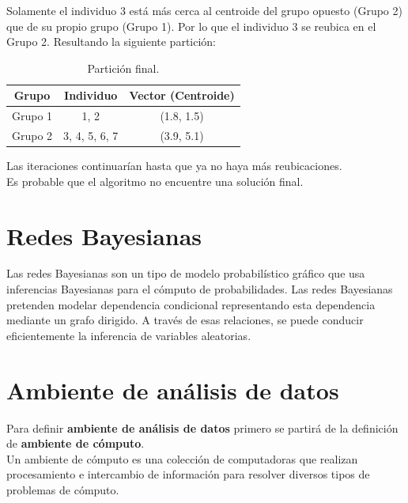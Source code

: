 \begin{UClist}
	\UCli Solamente el individuo 3 está más cerca al centroide del grupo opuesto (Grupo 2) que de su propio grupo (Grupo 1). Por lo que el individuo 3 se reubica en el Grupo 2. Resultando la siguiente partición:\\

	\begin{table}[H]
		\begin{center}
			\label{tab:particionFinal}
			\begin{tabular}{c|c|c}
				\textbf{Grupo} & \textbf{Individuo} & \textbf{Vector (Centroide)}\\
				\hline
				Grupo 1 & 1, 2 & (1.8, 1.5)\\
				Grupo 2 & 3, 4, 5, 6, 7 & (3.9, 5.1)\\
			\end{tabular}
		\end{center}
		\caption{Partición final.}
	\end{table}

	\UCli Las iteraciones continuarían hasta que ya no haya más reubicaciones.\\

	\UCli Es probable que el algoritmo no encuentre una solución final.

\end{UClist}

\section{Redes Bayesianas}
Las redes Bayesianas son un tipo de modelo probabilístico gráfico que usa inferencias Bayesianas para el cómputo de probabilidades. Las redes Bayesianas pretenden modelar dependencia condicional representando esta dependencia mediante un grafo dirigido. A través de esas relaciones, se puede conducir eficientemente la inferencia de variables aleatorias.\cite{bayesianas}\\

\section{Ambiente de análisis de datos}
\label{ambienteAnalisis}
Para definir \textbf{ambiente de análisis de datos} primero se partirá de la definición de \textbf{ambiente de cómputo}.\\

Un ambiente de cómputo es una colección de computadoras que realizan procesamiento e intercambio de información para resolver diversos tipos de problemas de cómputo.\cite{ambiente}\\

